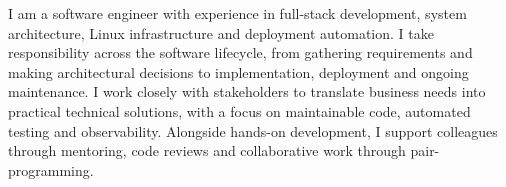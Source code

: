 I am a software engineer with experience in full-stack development,
system architecture, Linux infrastructure and deployment automation.
I take responsibility across the software lifecycle, from gathering
requirements and making architectural decisions to implementation,
deployment and ongoing maintenance. I work closely with stakeholders
to translate business needs into practical technical solutions,
with a focus on maintainable code, automated testing and observability.
Alongside hands-on development, I support colleagues through mentoring,
code reviews and collaborative work through pair-programming.
